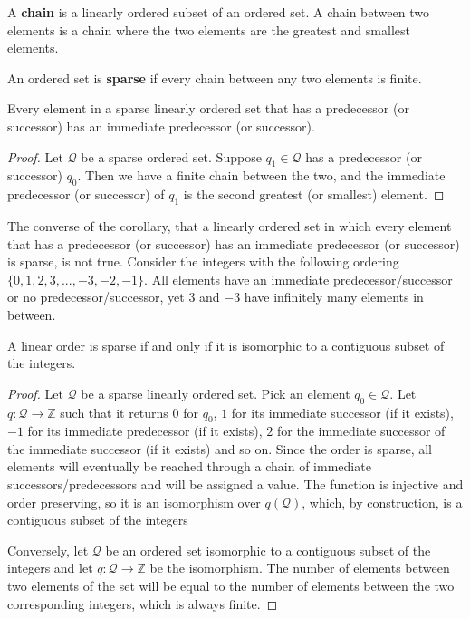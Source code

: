 \documentclass[11pt,letterpaper,fleqn]{memoir} %
\begin{document}
\begin{mathSection}
\begin{defn}
	A \textbf{chain} is a linearly ordered subset of an ordered set. A chain between two elements is a chain where the two elements are the greatest and smallest elements.
\end{defn}
\begin{defn}
	An ordered set is \textbf{sparse} if every chain between any two elements is finite.
\end{defn}
\begin{coro}
	Every element in a sparse linearly ordered set that has a predecessor (or successor) has an immediate predecessor (or successor).
\end{coro}
\begin{proof}
	Let $\mathcal{Q}$ be a sparse ordered set. Suppose $q_1 \in \mathcal{Q}$ has a predecessor (or successor) $q_0$. Then we have a finite chain between the two, and the immediate predecessor (or successor) of $q_1$ is the second greatest (or smallest) element.
\end{proof}

\begin{remark}
	The converse of the corollary, that a linearly ordered set in which every element that has a predecessor (or successor) has an immediate predecessor (or successor) is sparse, is not true. Consider the integers with the following ordering $\{0, 1, 2, 3, ... , -3, -2, -1\}$. All elements have an immediate predecessor/successor or no predecessor/successor, yet $3$ and $-3$ have infinitely many elements in between.
\end{remark}
\begin{prop}
	A linear order is sparse if and only if it is isomorphic to a contiguous subset of the integers.
\end{prop}
\begin{proof}
	Let $\mathcal{Q}$ be a sparse linearly ordered set. Pick an element $q_0 \in \mathcal{Q}$. Let $q : \mathcal{Q} \to \mathbb{Z}$ such that it returns $0$ for $q_0$, $1$ for its immediate successor (if it exists), $-1$ for its immediate predecessor (if it exists), $2$ for the immediate successor of the immediate successor (if it exists) and so on. Since the order is sparse, all elements will eventually be reached through a chain of immediate successors/predecessors and will be assigned a value. The function is injective and order preserving, so it is an isomorphism over $q(\mathcal{Q})$, which, by construction, is a contiguous subset of the integers
	
	Conversely, let $\mathcal{Q}$ be an ordered set isomorphic to a contiguous subset of the integers and let $q : \mathcal{Q} \to \mathbb{Z}$ be the isomorphism. The number of elements between two elements of the set will be equal to the number of elements between the two corresponding integers, which is always finite.
\end{proof}

\end{mathSection}
\end{document}
